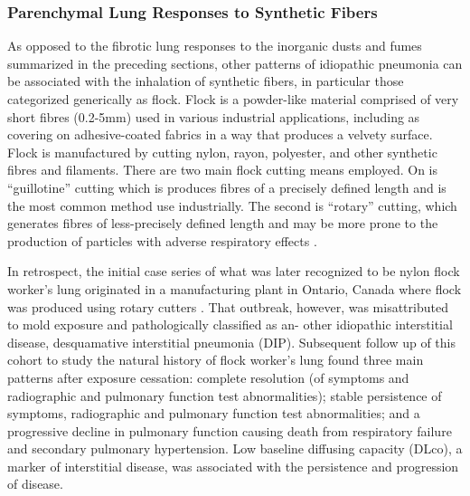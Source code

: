 \documentclass[a4
er,12pt]{article}
\begin{document}
\subsubsection{Parenchymal Lung Responses to Synthetic Fibers}

As opposed to the fibrotic lung responses to the inorganic dusts and fumes summarized in the preceding sections, other patterns of idiopathic pneumonia can be associated with the inhalation of synthetic fibers, in particular those categorized generically as flock. Flock is a powder-like material comprised of very short fibres (0.2-5mm) used in various industrial applications, including as covering on adhesive-coated fabrics in a way that produces a velvety surface. Flock is manufactured by cutting nylon, rayon, polyester, and other synthetic fibres and filaments. There are two main flock cutting means employed. On is “guillotine” cutting which is produces fibres of a precisely defined length and is the most common method use industrially. The second is “rotary” cutting, which generates fibres of less-precisely defined length and may be more prone to the production of particles  with adverse respiratory effects \cite{Kern1998}.

In retrospect, the initial case series of what was later recognized to be nylon flock worker’s lung originated in a manufacturing plant in Ontario, Canada where flock was produced using rotary cutters \cite{Lougheed1995}. That outbreak, however, was misattributed to mold exposure and pathologically classified as an- other idiopathic interstitial disease, desquamative interstitial pneumonia (DIP). Subsequent follow up of this cohort to study the natural history of flock worker’s lung \cite{Turcotte2013} found three main patterns after exposure cessation: complete resolution (of symptoms and radiographic and pulmonary function test abnormalities); stable persistence of symptoms, radiographic and pulmonary function test abnormalities; and a progressive decline in pulmonary function causing death from respiratory failure and secondary pulmonary hypertension. Low baseline diffusing capacity (DLco), a marker of interstitial disease, was associated with the persistence and progression of disease.
\end{document}
